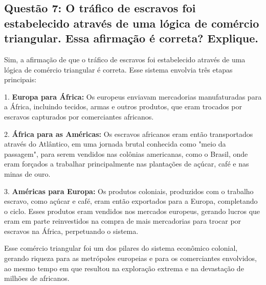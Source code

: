 \documentclass[a4paper,12pt]{article}[abntex2]
\begin{document}
\subsection{\textbf{Questão 7: O tráfico de escravos foi estabelecido através de uma lógica de comércio triangular. Essa afirmação é correta? Explique.}}

Sim, a afirmação de que o tráfico de escravos foi estabelecido através de uma lógica de comércio triangular é correta. Esse sistema envolvia três etapas principais: 

1. \textbf{Europa para África:} Os europeus enviavam mercadorias manufaturadas para a África, incluindo tecidos, armas e outros produtos, que eram trocados por escravos capturados por comerciantes africanos.

2. \textbf{África para as Américas:} Os escravos africanos eram então transportados através do Atlântico, em uma jornada brutal conhecida como "meio da passagem", para serem vendidos nas colônias americanas, como o Brasil, onde eram forçados a trabalhar principalmente nas plantações de açúcar, café e nas minas de ouro.

3. \textbf{Américas para Europa:} Os produtos coloniais, produzidos com o trabalho escravo, como açúcar e café, eram então exportados para a Europa, completando o ciclo. Esses produtos eram vendidos nos mercados europeus, gerando lucros que eram em parte reinvestidos na compra de mais mercadorias para trocar por escravos na África, perpetuando o sistema.

Esse comércio triangular foi um dos pilares do sistema econômico colonial, gerando riqueza para as metrópoles europeias e para os comerciantes envolvidos, ao mesmo tempo em que resultou na exploração extrema e na devastação de milhões de africanos.
\end{document}
